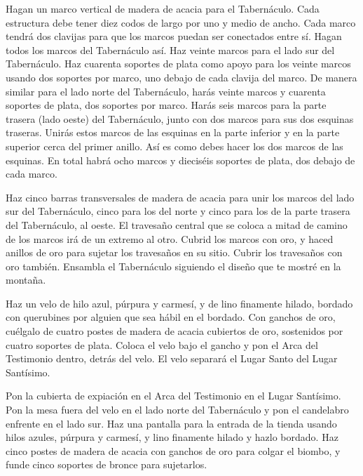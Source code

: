  Hagan un marco vertical de madera de acacia para el
Tabernáculo.  Cada estructura debe tener diez codos de
largo por uno y medio de ancho.  Cada marco tendrá dos
clavijas para que los marcos puedan ser conectados entre sí. Hagan todos
los marcos del Tabernáculo así.  Haz veinte marcos para el
lado sur del Tabernáculo.  Haz cuarenta soportes de plata
como apoyo para los veinte marcos usando dos soportes por marco, uno
debajo de cada clavija del marco.  De manera similar para
el lado norte del Tabernáculo, harás veinte marcos  y
cuarenta soportes de plata, dos soportes por marco.  Harás
seis marcos para la parte trasera (lado oeste) del Tabernáculo,
 junto con dos marcos para sus dos esquinas traseras.
 Unirás estos marcos de las esquinas en la parte inferior y
en la parte superior cerca del primer anillo. Así es como debes hacer
los dos marcos de las esquinas.  En total habrá ocho marcos
y dieciséis soportes de plata, dos debajo de cada marco.

 Haz cinco barras transversales de madera de acacia para
unir los marcos del lado sur del Tabernáculo,  cinco para
los del norte y cinco para los de la parte trasera del Tabernáculo, al
oeste.  El travesaño central que se coloca a mitad de
camino de los marcos irá de un extremo al otro.  Cubrid los
marcos con oro, y haced anillos de oro para sujetar los travesaños en su
sitio. Cubrir los travesaños con oro también.  Ensambla el
Tabernáculo siguiendo el diseño que te mostré en la montaña.

 Haz un velo de hilo azul, púrpura y carmesí, y de lino
finamente hilado, bordado con querubines por alguien que sea hábil en el
bordado.  Con ganchos de oro, cuélgalo de cuatro postes de
madera de acacia cubiertos de oro, sostenidos por cuatro soportes de
plata.  Coloca el velo bajo el gancho y pon el Arca del
Testimonio dentro, detrás del velo. El velo separará el Lugar Santo del
Lugar Santísimo.

 Pon la cubierta de expiación en el Arca del Testimonio en
el Lugar Santísimo.  Pon la mesa fuera del velo en el lado
norte del Tabernáculo y pon el candelabro enfrente en el lado sur.
 Haz una pantalla para la entrada de la tienda usando hilos
azules, púrpura y carmesí, y lino finamente hilado y hazlo bordado.
 Haz cinco postes de madera de acacia con ganchos de oro
para colgar el biombo, y funde cinco soportes de bronce para sujetarlos.

